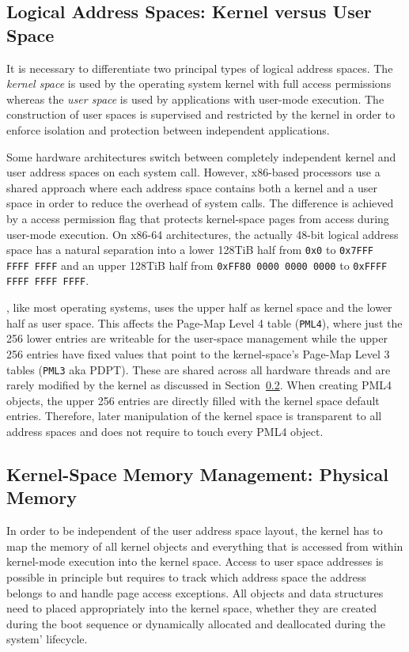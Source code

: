 \subsection{Logical Address Spaces: Kernel versus User Space}
\label{sec:address-space-phys}

It is necessary to differentiate two principal types of logical address spaces. The \emph{kernel space} is used by the operating system kernel with full access permissions whereas the \emph{user space} is used by applications with user-mode execution. The construction of user spaces is supervised and restricted by the kernel in order to enforce isolation and protection between independent applications. 

Some hardware architectures switch between completely independent kernel and user address spaces on each system call. However, x86-based processors use a shared approach where each address space contains both a kernel and a user space in order to reduce the overhead of system calls. The difference is achieved by a access permission flag that protects kernel-space pages from access during user-mode execution. On x86-64 architectures, the actually 48-bit logical address space has a natural separation into a lower 128TiB half from \texttt{0x0} to \texttt{0x7FFF\,FFFF\,FFFF} and an upper 128TiB half from \texttt{0xFF80\,0000\,0000\,0000} to \texttt{0xFFFF\,FFFF\,FFFF\,FFFF}. 

\mythos, like most operating systems, uses the upper half as kernel space and the lower half as user space. This affects the Page-Map Level 4 table (\texttt{PML4}), where just the 256 lower entries are writeable for the user-space management while the upper 256 entries have fixed values that point to the kernel-space's Page-Map Level 3 tables (\texttt{PML3} aka PDPT). These are shared across all hardware threads and are rarely modified by the kernel as discussed in Section~\ref{sec:kernel-space-management}. When creating PML4 objects, the upper 256 entries are directly filled with the kernel space default entries. Therefore, later manipulation of the kernel space is transparent to all address spaces and does not require to touch every PML4 object.

\subsection{Kernel-Space Memory Management: Physical Memory}
\label{sec:kernel-space-management}
In order to be independent of the user address space layout, the kernel has to map the memory of all kernel objects and everything that is accessed from within kernel-mode execution into the kernel space. Access to user space addresses is possible in principle but requires to track which address space the address belongs to and handle page access exceptions. All objects and data structures need to placed appropriately into the kernel space,  whether they are created during the boot sequence or dynamically allocated and deallocated during the system' lifecycle.

